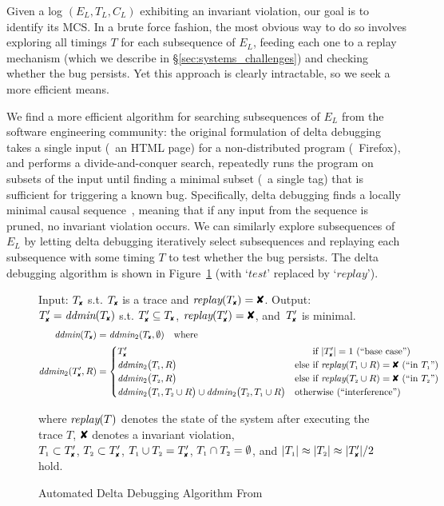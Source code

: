 Given a log $(E_L, T_L, C_L)$ exhibiting an invariant violation,
our goal is to identify its MCS. In a brute force fashion,
the most obvious way to do so involves exploring all timings $T$ for each
subsequence of $E_L$, feeding each one to a replay mechanism (which we
describe in \S\ref{sec:systems_challenges}) and checking whether the bug
persists. Yet this approach is clearly intractable, so we seek a more efficient
means.

We find a more efficient algorithm for searching subsequences of $E_L$ from
the software engineering community: the original formulation of delta debugging~\cite{Zeller:1999:YMP:318773.318946}
takes a single input (\eg~an HTML page)
for a non-distributed program (\eg~Firefox), and performs a divide-and-conquer
search, repeatedly runs the program on subsets of the input
until finding a minimal subset (\eg~a single tag) that is sufficient
for triggering a known bug. Specifically, delta debugging finds a locally minimal
causal sequence~\cite{Zeller:1999:YMP:318773.318946},
meaning that if any input from the sequence is pruned, no invariant violation
occurs. We can similarly explore subsequences of $E_L$ by letting delta
debugging iteratively select subsequences and replaying each subsequence with
some timing $T$ to test whether the bug persists.
The delta debugging algorithm is shown in
Figure~\ref{fig:ddmin} (with `$test$' replaced by `$replay$').

\begin{figure}[t]
\caption{Automated Delta Debugging Algorithm From~\cite{Zeller:1999:YMP:318773.318946}}
\begin{boxedminipage}{\textwidth}
Input: $\cfail$ s.t. $\cfail$ is a trace and $\test(\cfail) = \DFAIL$. Output: $\dfail
= \ddmin(\cfail)$ s.t. $\dfail \subseteq
\cfail$, $\test(\dfail) = \DFAIL$, and~$\dfail$ is minimal.
\begin{align*}
\ddmin(\cfail) &= \ddmin_2(\cfail, \emptyset) \quad \text{where} \\
\ddmin_2(\dfail, R) &=
\begin{cases}
\dfail & \text{\hphantom{else }if $|\dfail| = 1$ (``base case'')} \\
\ddmin_2\bigl(\done, R\bigr) &
\text{else if $\test(\done \cup R) = \DFAIL$ (``in $\done$'')} \\
\ddmin_2\bigl(\dtwo, R\bigr) &
\text{else if $\test(\dtwo \cup R) = \DFAIL$ (``in $\dtwo$'')} \\
\ddmin_2\bigl(\done, \dtwo \cup R\bigr) \cup \ddmin_2\bigl(\dtwo, \done \cup
R\bigr) & \text{otherwise (``interference'')}
\end{cases}
\end{align*}
\begin{center}
where $\textit{replay}(T)$ denotes the state of the system after executing the trace $T$,
$\DFAIL$ denotes a invariant violation, \\
$\done \subset \dfail$, $\dtwo \subset \dfail$, $\done \cup \dtwo = \dfail$, ${T_{\scriptscriptstyle 1}} \cap
{T_{\scriptscriptstyle 2}} = \emptyset$, and $|\done| \approx |\dtwo| \approx |\dfail| / 2$
hold.
\end{center}
\end{boxedminipage}
\label{fig:ddmin}
\end{figure}

